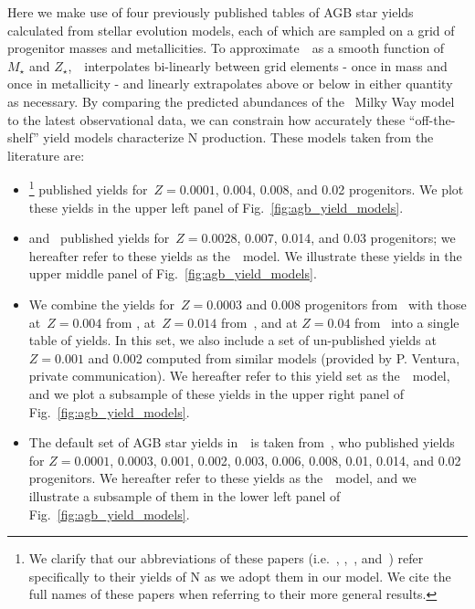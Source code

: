\documentclass[ms.tex]{subfiles}
\begin{document}
Here we make use of four previously published tables of AGB star yields
calculated from stellar evolution models, each of which are sampled on a grid
of progenitor masses and metallicities.
To approximate~~as a smooth function of~$M_\star$ and
$Z_\star$,~\vice~interpolates bi-linearly between grid elements - once in
mass and once in metallicity - and linearly extrapolates above or below in
either quantity as necessary.
By comparing the predicted abundances of the~\citet{Johnson2021} Milky Way
model to the latest observational data, we can constrain how accurately these
``off-the-shelf'' yield models characterize N production.
These models taken from the literature are:
\begin{itemize}
	\item[\textbf{1.}] \citet[][hereafter~\karakasten]{Karakas2010}\footnote{
		We clarify that our abbreviations of these papers (i.e.~\karakasten,
		\karakas,~\ventura, and~\cristallo) refer specifically to their yields
		of N as we adopt them in our model.
		We cite the full names of these papers when referring to their more
		general results.
	} published yields for~$Z = 0.0001$, 0.004, 0.008, and 0.02 progenitors.
	We plot these yields in the upper left panel of 
	Fig.~\ref{fig:agb_yield_models}.

	\item[\textbf{2.}] \citet{Karakas2016} and~\citet{Karakas2018} published
	yields for~$Z = 0.0028$, 0.007, 0.014, and 0.03 progenitors; we hereafter
	refer to these yields as the~\karakas~model.
	We illustrate these yields in the upper middle panel of
	Fig.~\ref{fig:agb_yield_models}.

	\item[\textbf{3.}] We combine the yields for~$Z = 0.0003$ and 0.008
	progenitors from~\citet{Ventura2013} with those at~$Z = 0.004$ from
	\citet{Ventura2014}, at~$Z = 0.014$ from~\citet{Ventura2018}, and at
	$Z = 0.04$ from~\citet{Ventura2020} into a single table of yields.
	In this set, we also include a set of un-published yields at~$Z = 0.001$
	and 0.002 computed from similar models (provided by P. Ventura, private
	communication).
	We hereafter refer to this yield set as the~\ventura~model, and we plot a
	subsample of these yields in the upper right panel of
	Fig.~\ref{fig:agb_yield_models}.

	\item[\textbf{4.}] The default set of AGB star yields in~\vice~is taken
	from~\citet{Cristallo2011, Cristallo2015}, who published yields for
	$Z = 0.0001$, 0.0003, 0.001, 0.002, 0.003, 0.006, 0.008, 0.01, 0.014, and
	0.02 progenitors.
	We hereafter refer to these yields as the~\cristallo~model, and we
	illustrate a subsample of them in the lower left panel of
	Fig.~\ref{fig:agb_yield_models}.
\end{itemize}
\end{document}
